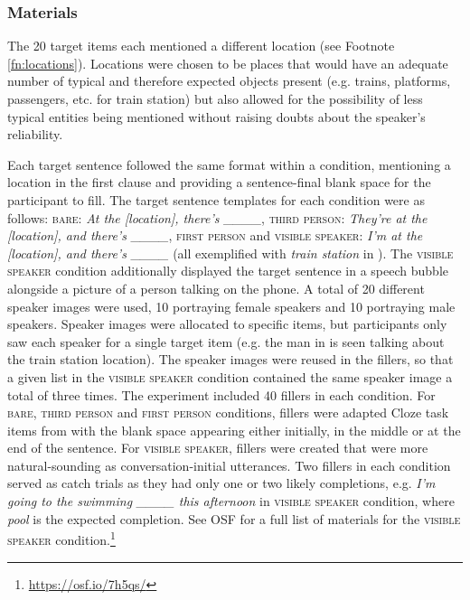 \documentclass[output=paper,colorlinks,citecolor=brown]{langscibook}
\begin{document}
\subsubsection{Materials}

The 20 target items each mentioned a different location (see Footnote \ref{fn:locations}). Locations were chosen to be places that would have an adequate number of typical and therefore expected objects present (e.g. trains, platforms, passengers, etc. for train station) but also allowed for the possibility of less typical entities being mentioned without raising doubts about the speaker's reliability.

Each target sentence followed the same format within a condition, mentioning a location in the first clause and providing a sentence-final blank space for the participant to fill. The target sentence templates for each condition were as follows: \textsc{bare}: \textit{At the [location], there’s \mbox{\_\_\_\_}}, \textsc{third person}: \textit{They’re at the [location], and there’s \mbox{\_\_\_\_}}, \textsc{first person} and \textsc{visible speaker}: \textit{I’m at the [location], and there’s \mbox{\_\_\_\_}} (all exemplified with \textit{train station} in ). The \textsc{visible speaker} condition additionally displayed the target sentence in a speech bubble alongside a picture of a person talking on the phone. A total of 20 different speaker images were used, 10 portraying female speakers and 10 portraying male speakers. Speaker images were allocated to specific items, but participants only saw each speaker for a single target item (e.g. the man in  is seen talking about the train station location). The speaker images were reused in the fillers, so that a given list in the \textsc{visible speaker} condition contained the same speaker image a total of three times. The experiment included 40 fillers in each condition. For \textsc{bare}, \textsc{third person} and \textsc{first person} conditions, fillers were adapted Cloze task items from \citet{AltarribaEtAl1996} with the blank space appearing either initially, in the middle or at the end of the sentence. For \textsc{visible speaker}, fillers were created that were more natural-sounding as conversation-initial utterances. Two fillers in each condition served as catch trials as they had only one or two likely completions, e.g. \textit{I’m going to the swimming \_\_\_\_ this afternoon} in \textsc{visible speaker} condition, where \textit{pool} is the expected completion. See OSF for a full list of materials for the \textsc{visible speaker} condition.\footnote{\url{https://osf.io/7h5qs/}}
\end{document}
